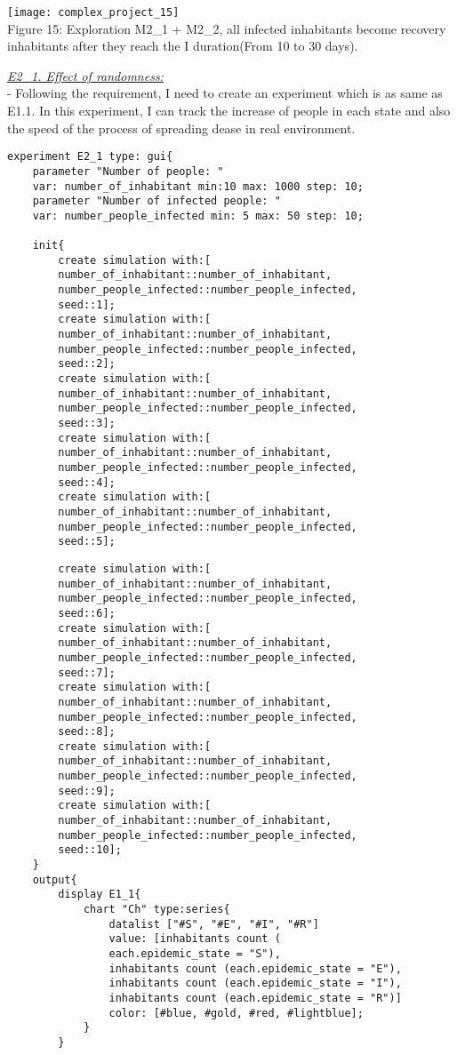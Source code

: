 \documentclass{article}
\begin{document}
\begin{pic15}
\texttt{[image: complex\_project\_15]}
\\
\caption{Figure 15: Exploration M2\_1 + M2\_2, all infected inhabitants become recovery inhabitants after they reach the I duration(From 10 to 30 days).} 
\begin{pic15}
\newpage
\underline{\textit{E2\_1. Effect of randomness:}}
\\- Following the requirement, I need to create an experiment which is as same as E1.1. In this experiment, I can track the increase of people in each state and also the speed of the process of spreading dease in real environment.
\begin{tcolorbox}
\begin{lstlisting}
experiment E2_1 type: gui{
	parameter "Number of people: " 
	var: number_of_inhabitant min:10 max: 1000 step: 10;
	parameter "Number of infected people: " 
	var: number_people_infected min: 5 max: 50 step: 10;
	
	init{
		create simulation with:[
		number_of_inhabitant::number_of_inhabitant,
		number_people_infected::number_people_infected,
		seed::1];
		create simulation with:[
		number_of_inhabitant::number_of_inhabitant,
		number_people_infected::number_people_infected,
		seed::2];
		create simulation with:[
		number_of_inhabitant::number_of_inhabitant,
		number_people_infected::number_people_infected,
		seed::3];
		create simulation with:[
		number_of_inhabitant::number_of_inhabitant,
		number_people_infected::number_people_infected,
		seed::4];
		create simulation with:[
		number_of_inhabitant::number_of_inhabitant,
		number_people_infected::number_people_infected,
		seed::5];
\end{lstlisting}
\end{tcolorbox}
\begin{tcolorbox}
\begin{lstlisting}
		create simulation with:[
		number_of_inhabitant::number_of_inhabitant,
		number_people_infected::number_people_infected,
		seed::6];
		create simulation with:[
		number_of_inhabitant::number_of_inhabitant,
		number_people_infected::number_people_infected,
		seed::7];
		create simulation with:[
		number_of_inhabitant::number_of_inhabitant,
		number_people_infected::number_people_infected,
		seed::8];
		create simulation with:[
		number_of_inhabitant::number_of_inhabitant,
		number_people_infected::number_people_infected,
		seed::9];
		create simulation with:[
		number_of_inhabitant::number_of_inhabitant,
		number_people_infected::number_people_infected,
		seed::10];
	}
	output{
		display E1_1{
			chart "Ch" type:series{
				datalist ["#S", "#E", "#I", "#R"] 
				value: [inhabitants count (
				each.epidemic_state = "S"), 
				inhabitants count (each.epidemic_state = "E"), 
				inhabitants count (each.epidemic_state = "I"), 
				inhabitants count (each.epidemic_state = "R")] 
				color: [#blue, #gold, #red, #lightblue];
			}
		}
		

\end{lstlisting}
\end{tcolorbox}
\end{pic15}
\end{pic15}
\end{document}
